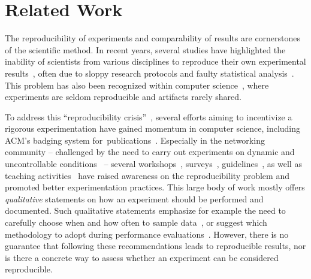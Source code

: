 
\section{Related Work}
\label{sec:relWorks}

The reproducibility of experiments and comparability of results are cornerstones of the scientific method.
In recent years, several studies have highlighted the inability of scientists from various disciplines to reproduce their own experimental results~\cite{baker16reproducibility, peng15crisis}, often due to sloppy research protocols and faulty statistical analysis~\cite{boisvert2016Incentivizing, blackburn2016Truth, schmid2014measuring}.
This problem has also been recognized within computer science~\cite{collberg15reproducibility, vitek11systems}, where experiments are seldom reproducible and artifacts rarely shared.


To address this ``\mbox{reproducibility} crisis''~\cite{baker16reproducibility}, several efforts aiming to incentivize a rigorous experimentation have gained momentum in computer science, including \eg ACM's badging system \mbox{for publications}~\cite{acmBadges}.
Especially in the networking community -- challenged by the need to carry out experiments on dynamic and uncontrollable conditions~\cite{burchfield09rfjungle, matos18reproducible} -- several workshops~\cite{bajpai18dagstuhl_report, cpsbench18cpsweek, reproducibility17sigcomm}, surveys~\cite{flittner2018artifacts_survey}, guidelines~\cite{bajpai19dagstuhl_guide, saucez2018Thoughts, kritsis2018Tutorial, sevenwaystofail}, as well as teaching activities~\cite{yan17learning} have raised awareness on the reproducibility problem and promoted better experimentation practices.
This large body of work mostly offers \emph{qualitative} statements on how an experiment should be performed and documented.
Such qualitative statements emphasize for example the need to carefully choose when and how often to sample data~\cite{bajpai19dagstuhl_guide}, or suggest which methodology to adopt during performance evaluations~\cite{kritsis2018Tutorial}.
However, there is no guarantee that following these recommendations leads to reproducible results, nor is there a concrete way to assess whether an experiment can be considered reproducible.

